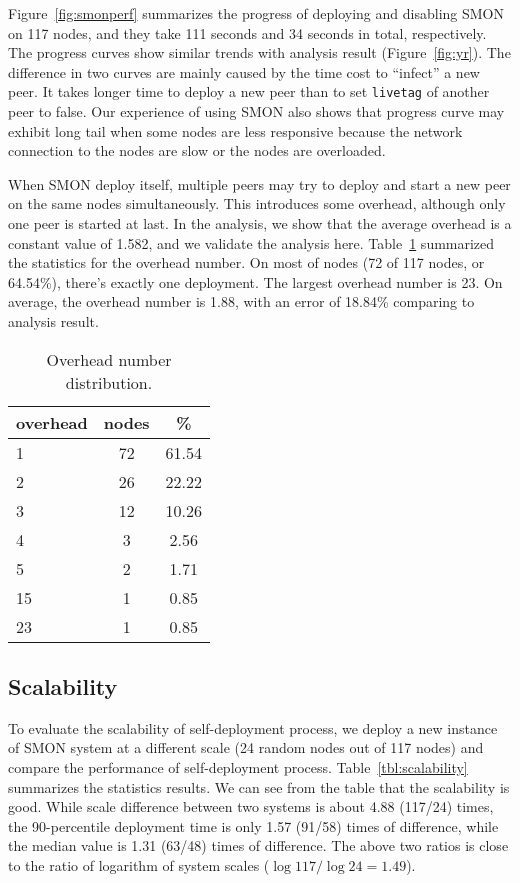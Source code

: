 Figure~\ref{fig:smonperf} summarizes the progress of
deploying and disabling SMON on 117 nodes, and they take
111 seconds and 34 seconds in total, respectively. The
progress curves show similar trends with analysis result
(Figure~\ref{fig:yr}). The difference in two curves are
mainly caused by the time cost to ``infect'' a new peer. It
takes longer time to deploy a new peer than to set
\texttt{livetag} of another peer to false. Our experience
of using SMON also shows that progress curve may exhibit
long tail when some nodes are less responsive because the
network connection to the nodes are slow or the nodes are
overloaded.

When SMON deploy itself, multiple peers may try to deploy
and start a new peer on the same nodes simultaneously. This
introduces some overhead, although only one peer is started
at last. In the analysis, we show that the average overhead
is a constant value of 1.582, and we validate the analysis
here. Table~\ref{tbl:overhead} summarized the statistics for
the overhead number. On most of nodes (72 of 117 nodes, or
64.54\%), there's exactly one deployment. The largest
overhead number is 23. On average, the overhead number is
1.88, with an error of 18.84\% comparing to analysis result.

\begin{table}[hb]
\centering
\begin{tabular}{|l|c|c|}
\hline
overhead & nodes & \% \\
\hline
1 & 72 & 61.54 \\
2 & 26 & 22.22 \\
3 & 12 & 10.26 \\
4 & 3 & 2.56 \\
5 & 2 & 1.71 \\
15 & 1 & 0.85 \\
23 & 1 & 0.85 \\
\hline
\end{tabular}
\caption{Overhead number distribution.}
\label{tbl:overhead}
\end{table}

\subsection{Scalability}

To evaluate the scalability of self-deployment process, we
deploy a new instance of SMON system at a different scale
(24 random nodes out of 117 nodes) and compare the
performance of self-deployment process.
Table~\ref{tbl:scalability} summarizes the statistics
results.  We can see from the table that the scalability is
good.  While scale difference between two systems is about
4.88 (117/24) times, the 90-percentile deployment time is
only 1.57 (91/58) times of difference, while the median
value is 1.31 (63/48) times of difference.  The above two
ratios is close to the ratio of logarithm of system scales
($\log 117 / \log 24 = 1.49$).

